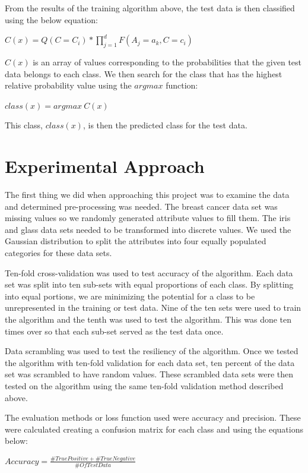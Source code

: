 \documentclass[twoside,11pt]{article}
\begin{document}
From the results of the training algorithm above, the test data is then classified using the below equation:
\begin{center}
    $C(x) = Q(C=C_i) * \prod_{j=1}^d F(A_j = a_k, C = c_i)$
\end{center}
$C(x)$ is an array of values corresponding to the probabilities that the given test data belongs to each class. We then search for the class that has the highest relative probability value using the $argmax$ function:
\begin{center}
    $class(x) = argmax\ C(x)$
\end{center}
This class, $class(x)$, is then the predicted class for the test data.

\section{Experimental Approach}

The first thing we did when approaching this project was to examine the data and determined pre-processing was needed. The breast cancer data set was missing values so we randomly generated attribute values to fill them. The iris and glass data sets needed to be transformed into discrete values. We used the Gaussian distribution to split the attributes into four equally populated categories for these data sets.

Ten-fold cross-validation was used to test accuracy of the algorithm.  Each data set was split into ten sub-sets with equal proportions of each class. By splitting into equal portions, we are minimizing the potential for a class to be unrepresented in the training or test data. Nine of the ten sets were used to train the algorithm and the tenth was used to test the algorithm. This was done ten times over so that each sub-set served as the test data once. 

Data scrambling was used to test the resiliency of the algorithm. Once we tested the algorithm with ten-fold validation for each data set, ten percent of the data set was scrambled to have random values. These scrambled data sets were then tested on the algorithm using the same ten-fold validation method described above.   

The evaluation methods or loss function used were accuracy and precision. These were calculated creating a confusion matrix for each class and using the equations below:
\begin{center}
    $Accuracy = \frac{\#TruePositive + \#TrueNegative}{\# Of TestData}$\\
\end{center}
\end{document}
